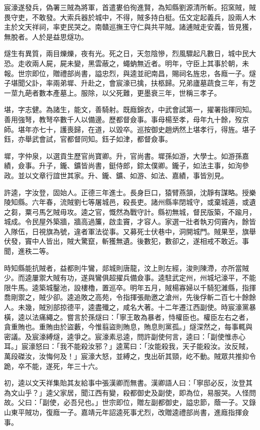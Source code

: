 \begin{pinyinscope}
宸濠遂發兵，偽署三賊為將軍，首遣婁伯徇進賢，為知縣劉源清所斬。招窯賊，賊畏守吏，不敢發。大索兵器於城中，不得，賊多持白梃。伍文定起義兵，設兩人木主於文天祥祠，率吏民哭之。南贛巡撫王守仁與共平賊。諸逋賊走安義，皆見獲，無脫者。人於是益思燧功。

燧生有異質，兩目爍爍，夜有光。死之日，天忽陰慘，烈風驟起凡數日，城中民大恐。走收兩人屍，屍未變，黑雲蔽之，蠅蚋無近者。明年，守臣上其事於朝，未報。世宗即位，贈禮部尚書，謚忠烈，與逵並祀南昌，賜祠名旌忠，各廕一子。燧子堪聞父訃，率兩弟墀、升赴之，會宸濠已擒，扶柩歸。兄弟廬墓蔬食三年，有芝一莖九葩者數本產墓上。服除，以父死難，更墨衰三年，世稱三孝子。

堪，字志健。為諸生，能文，善騎射。既廕錦衣，中武會試第一，擢署指揮同知。善用強弩，教弩卒數千人以備邊。歷都督僉事。事母楊至孝，母年九十餘，歿京師。堪年亦七十，護喪歸，在道，以毀卒。巡按御史趙炳然上堪孝行，得旌。堪子鈺，亦舉武會試，官都督同知。鈺子如津，都督僉事。

墀，字仲泉，以選貢生歷官尚寶卿。升，官尚書。墀孫如游，大學士。如游孫嘉績，僉事。升子，鑨、鑛皆尚書，鋌侍郎，錝太僕卿。鑨子，如法主事，如洵參政。並以文章行誼世其家。升、鑨、鑛、如游、如法、嘉績，事皆別見。

許逵，字汝登，固始人。正德三年進士。長身巨口，猿臂燕頷，沈靜有謀略。授樂陵知縣。六年春，流賊劉七等屠城邑，殺長吏。諸州縣率閉城守，或棄城遁，或遺之芻，粟弓馬乞賊毋攻。逵之官，慨然為戰守計。縣初無城，督民版築，不踰月，城成。令民屋外築牆，牆高過簾，啟圭竇，才容人。家選一壯者執刃伺竇內，餘皆入隊伍，日視旗為號，違者軍法從事。又募死士伏巷中，洞開城門。賊果至，旗舉伏發，竇中人皆出，賊大驚竄，斬獲無遺。後數犯，數卻之，遂相戒不敢近。事聞，進秩二等。

時知縣能抗賊者，益都則牛鸞，郯城則唐龍，汶上則左經，浚則陳滯，亦所當賊少。而逵屢禦大賊有功，遂與鸞俱超擢兵備僉事。逵駐武定州，州城圮濠平，不能限牛馬。逵築城鑿池，設樓櫓，置巡卒。明年五月，賊楊寡婦以千騎犯濰縣，指揮喬剛禦之，賊少卻。逵追敗之高苑，令指揮張勛邀之滄州，先後俘斬二百七十餘餘人。未幾，賊別部掠德平，逵盡殲之，咸名大著。十二年遷江西副使。時宸濠黨暴橫，逵以法痛繩之。嘗言於孫燧曰：「寧王敢為暴者，恃權臣也。權臣左右之者，貪重賄也。重賄由於盜藪，今惟翦盜則賄息，賄息則黨孤。」燧深然之，每事輒與密議。及宸濠縛燧，逵爭之。宸濠素忌逵，問許副使何言，逵曰：「副使惟赤心耳。」宸濠怒曰：「我不能殺汝邪？」逵罵曰：「汝能殺我，天子能殺汝。汝反賊，萬段磔汝，汝悔何及！」宸濠大怒，並縛之，曳出斫其頸，屹不動。賊眾共推抑令跪，卒不能，遂死，年三十六。

初，逵以文天祥集貽其友給事中張漢卿而無書。漢卿語人曰：「寧邸必反，汝登其為文山乎？」逵父家居，聞江西有變，殺都御史及副使，即為位，易服哭。人怪問故。父曰：「副使，必吾兒也。」世宗即位，贈左副都御史，謚忠節，蔭一子。又錄山東平賊功，復廕一子。嘉靖元年詔逵死事尤烈，改贈逵禮部尚書，進廕指揮僉事。


\end{pinyinscope}
